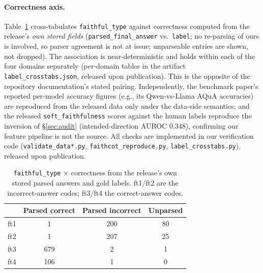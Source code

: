 \documentclass[11pt]{article}
\begin{document}
\paragraph{Correctness axis.} Table~\ref{tab:crosstab} cross-tabulates \texttt{faithful\_type} against correctness computed from the release's \emph{own stored fields} (\texttt{parsed\_final\_answer} vs.\ \texttt{label}; no re-parsing of ours is involved, so parser agreement is not at issue; unparseable entries are shown, not dropped). The association is near-deterministic and holds within each of the four domains separately (per-domain tables in the artifact \texttt{label\_crosstabs.json}, released upon publication). This is the opposite of the repository documentation's stated pairing. Independently, the benchmark paper's reported per-model accuracy figures (e.g., its Qwen-vs-Llama AQuA accuracies) are reproduced from the released data only under the data-side semantics; and the released \texttt{soft\_faithfulness} scores against the human labels reproduce the inversion of \S\ref{sec:audit} (intended-direction AUROC 0.348), confirming our feature pipeline is not the source. All checks are implemented in our verification code (\texttt{validate\_data*.py}, \texttt{faithcot\_reproduce.py}, \texttt{label\_crosstabs.py}), released upon publication.

\begin{table}[h]
\centering
\small
\begin{tabular}{@{}lccc@{}}
\toprule
 & \textbf{Parsed correct} & \textbf{Parsed incorrect} & \textbf{Unparsed} \\
\midrule
ft1 & 1 & 200 & 80 \\
ft2 & 1 & 207 & 25 \\
ft3 & 679 & 2 & 1 \\
ft4 & 106 & 1 & 0 \\
\bottomrule
\end{tabular}
\caption{\texttt{faithful\_type} $\times$ correctness from the release's own stored parsed answers and gold labels. ft1/ft2 are the incorrect-answer codes; ft3/ft4 the correct-answer codes.}
\label{tab:crosstab}
\end{table}
\end{document}
